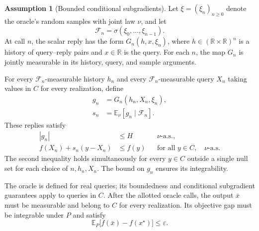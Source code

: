 \documentclass[10pt]{article}
\theoremstyle{definition}
\newtheorem{assumption}{Assumption}
\begin{document}
\begin{assumption}[Bounded conditional subgradients]
Let $\xi=(\xi_n)_{n\geq0}$ denote the oracle's random samples with joint law $\nu$, and let
\[
\mathcal{F}_n=\sigma(\xi_0,\ldots,\xi_{n-1}).
\]
At call $n$, the scalar reply has the form $G_n(h,x,\xi_n)$, where $h\in(\mathbb{R}\times\mathbb{R})^n$ is a history of query--reply pairs and $x\in\mathbb{R}$ is the query. For each $n$, the map $G_n$ is jointly measurable in its history, query, and sample arguments.

For every $\mathcal{F}_n$-measurable history $h_n$ and every $\mathcal{F}_n$-measurable query $X_n$ taking values in $C$ for every realization, define
\[
\begin{aligned}
g_n&=G_n(h_n,X_n,\xi_n),\\
s_n&=\mathbb{E}_{\nu}[g_n\mid\mathcal{F}_n].
\end{aligned}
\]
These replies satisfy
\[
\begin{aligned}
|g_n|&\leq H &&\nu\text{-a.s.},\\
f(X_n)+s_n(y-X_n)&\leq f(y)
&&\text{for all }y\in C,\quad\nu\text{-a.s.}
\end{aligned}
\]
The second inequality holds simultaneously for every $y\in C$ outside a single null set for each choice of $n,h_n,X_n$. The bound on $g_n$ ensures its integrability.
\end{assumption}

The oracle is defined for real queries; its boundedness and conditional subgradient guarantees apply to queries in $C$. After the allotted oracle calls, the output $\bar{x}$ must be measurable and belong to $C$ for every realization. Its objective gap must be integrable under $P$ and satisfy
\[
\mathbb{E}_{P}\bigl[f(\bar{x})-f(x^\star)\bigr]\leq\varepsilon.
\]
\end{document}
